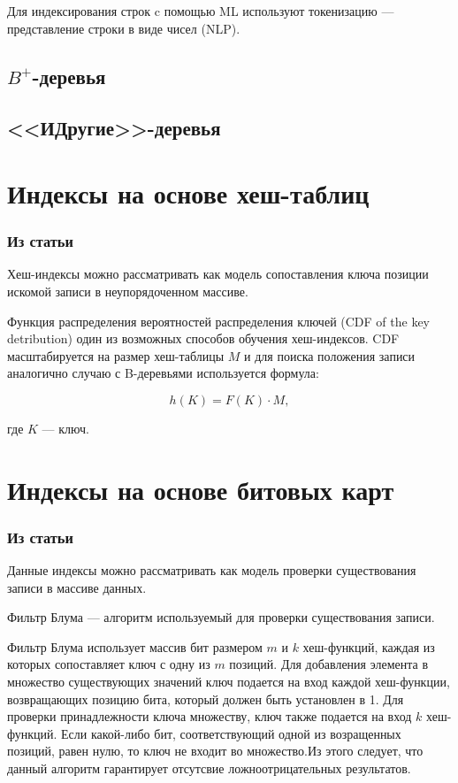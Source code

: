 Для индексирования строк c помощью ML используют токенизацию --- представление
строки в виде чисел (NLP).

\subsection{$B^+$-деревья}

\subsection{<<ИДругие>>-деревья}

\section{Индексы на основе хеш-таблиц}

\subsubsection{Из статьи}

Хеш-индексы можно рассматривать как модель сопоставления ключа позиции
искомой записи в неупорядоченном массиве.


Функция распределения вероятностей распределения ключей (CDF of the key
detribution) один из возможных способов обучения хеш-индексов. CDF
масштабируется на размер хеш-таблицы $M$ и для поиска положения записи
аналогично случаю с B-деревьями используется формула:

\begin{equation}
    h(K) = F(K) \cdot M,
\end{equation}

где $K$ --- ключ.

\section{Индексы на основе битовых карт}

\subsubsection{Из статьи}
Данные индексы можно рассматривать как модель проверки существования записи в
массиве данных.

Фильтр Блума --- алгоритм используемый для проверки существования записи.

Фильтр Блума использует массив бит размером $m$ и $k$ хеш-функций, каждая из
которых сопоставляет ключ с одну из $m$ позиций. Для добавления элемента в
множество существующих значений ключ подается на вход каждой хеш-функции,
возвращающих позицию бита, который должен быть установлен в 1. Для проверки
принадлежности ключа множеству, ключ также подается на вход $k$ хеш-функций.
Если какой-либо бит, соответствующий одной из возращенных позиций, равен нулю,
то ключ не входит во множество.Из этого следует, что данный алгоритм гарантирует
отсутсвие ложноотрицательных результатов.

